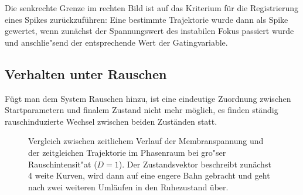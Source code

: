 \documentclass[12pt,a4paper]{article}
\begin{document}
Die senkrechte Grenze im rechten Bild ist auf das Kriterium für die Registrierung eines Spikes zurückzuführen: Eine bestimmte Trajektorie wurde dann als Spike gewertet, wenn zunächst der Spannungswert des instabilen Fokus passiert wurde und anschlie"send der entsprechende Wert der Gatingvariable.
\subsection{Verhalten unter Rauschen}
Fügt man dem System Rauschen hinzu, ist eine eindeutige Zuordnung zwischen Startparametern und finalem Zustand nicht mehr möglich, es finden ständig rauschinduzierte Wechsel zwischen beiden Zuständen statt.
\begin{figure}[H]
	\hspace*{-0.5cm}
	\caption{Vergleich zwischen zeitlichem Verlauf der Membranspannung und der zeitgleichen Trajektorie im Phasenraum bei gro"ser Rauschintensit"at ($D=1$). Der Zustandsvektor beschreibt zunächst 4 weite Kurven, wird dann auf eine engere Bahn gebracht und geht nach zwei weiteren Umläufen in den Ruhezustand über.}
	\label{trans}
\end{figure}
\end{document}
